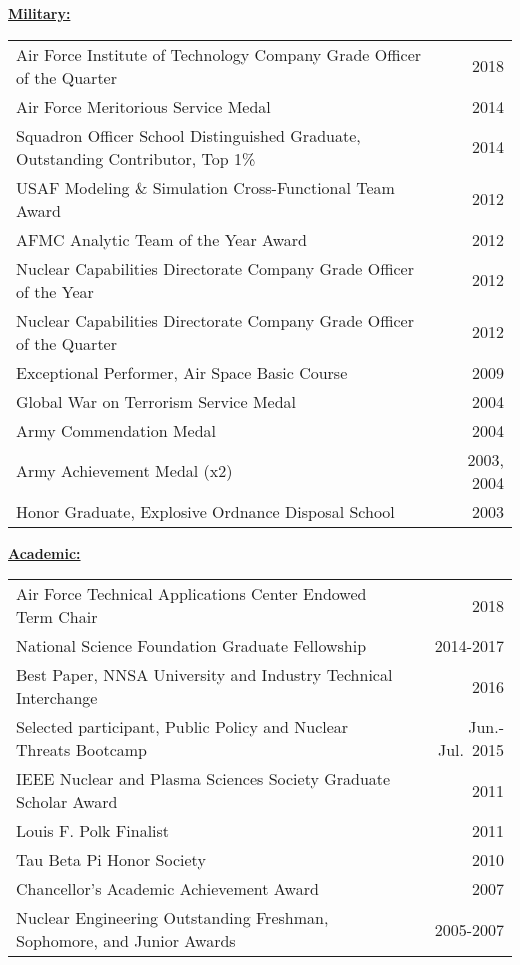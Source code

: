 \underline{\textbf{Military:}}\\
\begin{tabular}{ @{} l @{\hspace{6ex}} r }
Air Force Institute of Technology Company Grade Officer of the Quarter & 2018 \\
Air Force Meritorious Service Medal & 2014 \\
Squadron Officer School Distinguished Graduate, Outstanding Contributor, Top 1\% & 2014 \\
USAF Modeling \& Simulation Cross-Functional Team Award & 2012 \\
AFMC Analytic Team of the Year Award & 2012 \\
Nuclear Capabilities Directorate Company Grade Officer of the Year & 2012 \\
Nuclear Capabilities Directorate Company Grade Officer of the Quarter & 2012 \\
Exceptional Performer, Air Space Basic Course & 2009 \\
Global War on Terrorism Service Medal & 2004 \\
Army Commendation Medal & 2004 \\
Army Achievement Medal (x2) & 2003, 2004 \\
Honor Graduate, Explosive Ordnance Disposal School & 2003 \\
\end{tabular}

\underline{\textbf{Academic:}}\\
\begin{tabular}{ @{} l @{\hspace{9.5ex}} r }
Air Force Technical Applications Center Endowed Term Chair & 2018\\
National Science Foundation Graduate Fellowship & 2014-2017 \\
Best Paper, NNSA University and Industry Technical Interchange & 2016 \\
Selected participant, Public Policy and Nuclear Threats Bootcamp	& Jun.-Jul.\ 2015 \\
IEEE Nuclear and Plasma Sciences Society Graduate Scholar Award & 2011 \\
Louis F. Polk Finalist & 2011 \\
Tau Beta Pi Honor Society	& 2010 \\
Chancellor’s Academic Achievement Award	& 2007 \\
Nuclear Engineering Outstanding Freshman, Sophomore, and Junior Awards & 2005-2007 \\
\end{tabular}
